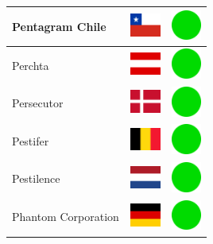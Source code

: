 \documentclass[12pt, a4paper, twoside]{report}
\begin{document}
\begin{center}
\begin{longtable}{|p{5cm}|p{2cm}|p{2cm}|}
 Pentagram Chile                                            & \includegraphics[width=1cm]{../4x3/cl} &   \includegraphics[width=1cm]{../likes/y} \\ \hline
 Perchta                                                    & \includegraphics[width=1cm]{../4x3/at} &   \includegraphics[width=1cm]{../likes/y} \\ \hline
 Persecutor                                                 & \includegraphics[width=1cm]{../4x3/dk} &   \includegraphics[width=1cm]{../likes/y} \\ \hline
 Pestifer                                                   & \includegraphics[width=1cm]{../4x3/be} &   \includegraphics[width=1cm]{../likes/y} \\ \hline
 Pestilence                                                 & \includegraphics[width=1cm]{../4x3/nl} &   \includegraphics[width=1cm]{../likes/y} \\ \hline
 Phantom Corporation                                        & \includegraphics[width=1cm]{../4x3/de} &   \includegraphics[width=1cm]{../likes/y} \\ \hline

\end{longtable}
\end{center}
\end{document}
